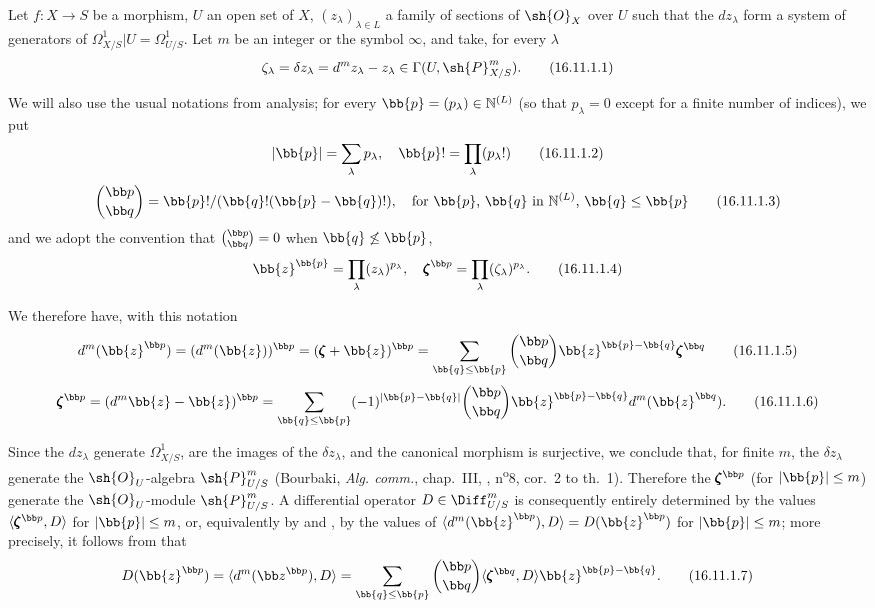 \begin{env}[16.11.1]
\label{IV.16.11.1}
Let $f:X \to S$ be a morphism, $U$ an open set of $X$, $(z_\lambda)_{\lambda \in L}$ a family of sections of $\sh{O}_X$ over $U$ such that the $dz_\lambda$ form a system of generators of $\Omega_{X/S}^1|U = \Omega_{U/S}^1$.
Let $m$ be an integer or the symbol $\infty$, and take, for every $\lambda$
\[
  \label{IV.16.11.1.1}
  \zeta_\lambda = \delta z_\lambda = d^m z_\lambda - z_\lambda \in \Gamma(U, \sh{P}_{X/S}^m).
  \tag{16.11.1.1}
\]

We will also use the usual notations from analysis;
for every $\bb{p} = (p_\lambda) \in \mathbb{N}^{(L)}$ (so that $p_\lambda = 0$ except for a finite number of indices), we put
\[
  \label{IV.16.11.1.2}
  |\bb{p}| = \sum_\lambda p_\lambda, \quad \bb{p}! = \prod_\lambda (p_\lambda!)
  \tag{16.11.1.2}
\]
\[
  \label{IV.16.11.1.3}
  \binom{\bb p}{\bb q} = \bb{p}!/(\bb{q}!(\bb{p} - \bb{q})!), \quad \text{for $\bb{p}$, $\bb{q}$ in $\mathbb{N}^{(L)}$, $\bb{q} \leq \bb{p}$}
  \tag{16.11.1.3}
\]
and we adopt the convention that $\binom{\bb p}{\bb q} = 0$ when $\bb{q} \not\leq \bb{p}$,
\[
  \label{IV.16.11.1.4}
  \bb{z}^\bb{p} = \prod_\lambda (z_\lambda)^{p_\lambda}, \quad {\pmb\zeta}^{\bb p} = \prod_\lambda (\zeta_\lambda)^{p_\lambda}.
  \tag{16.11.1.4}
\]

We therefore have, with this notation
\[
  \label{IV.16.11.1.5}
  d^m(\bb{z}^{\bb p}) = (d^m(\bb{z}))^{\bb p} = (\pmb{\zeta} + \bb{z})^{\bb p} = \sum_{\bb{q} \leq \bb{p}} \binom{\bb p}{\bb q} \bb{z}^{\bb{p} - \bb{q}} \pmb{\zeta}^{\bb q}
  \tag{16.11.1.5}
\]
\[
  \label{IV.16.11.1.6}
  \pmb{\zeta}^{\bb p} = (d^m \bb{z} - \bb{z})^{\bb p} =  \sum_{\bb{q} \leq \bb{p}} (-1)^{|\bb{p} - \bb{q}|} \binom{\bb p}{\bb q} \bb{z}^{\bb{p} - \bb{q}} d^m(\bb{z}^{\bb q}).
  \tag{16.11.1.6}
\]
  
Since the $dz_\lambda$ generate $\Omega_{X/S}^1$, are the images of the $\delta z_\lambda$, and the canonical morphism  is surjective, we conclude that, for finite $m$, the $\delta z_\lambda$ generate the $\sh{O}_U$-algebra $\sh{P}_{U/S}^m$ (Bourbaki, \emph{Alg. comm.}, chap.~III, , n\textsuperscript{o}8, cor.\ 2 to th.\ 1).
Therefore the $\pmb{\zeta}^{\bb p}$ (for $|\bb{p}| \leq m$) generate the $\sh{O}_U$-module $\sh{P}_{U/S}^m$.
A differential operator $D \in \Diff_{U/S}^m$ is consequently entirely determined by the values $\langle \pmb{\zeta}^{\bb p}, D \rangle$ for $|\bb{p}| \leq m$, or, equivalently by  and , by the values
of $\langle d^m(\bb{z}^{\bb p}), D \rangle = D(\bb{z}^{\bb p})$ for $|\bb{p}| \leq m$;
more precisely, it follows from  that
\[
  \label{IV.16.11.1.7}
  D(\bb{z}^{\bb p}) = \langle d^m({\bb z}^{\bb p}), D \rangle = \sum_{\bb{q} \leq \bb{p}} \binom{\bb p}{\bb q} \langle \pmb{\zeta}^{\bb q} , D \rangle \bb{z}^{\bb{p} - \bb{q}}.
  \tag{16.11.1.7}
\]
\end{env}

